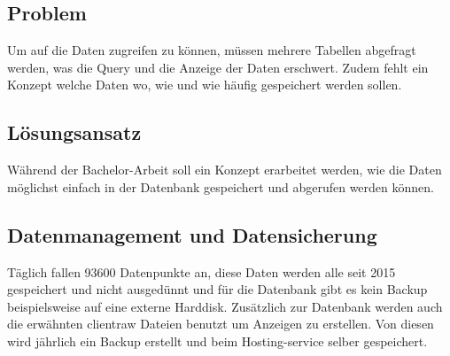 \begin{table}[h!]
\caption{Vorhandene Daten in der Datenbank}
\label{table:db-tables}
\end{table}

\subsection*{Problem}
Um auf die Daten zugreifen zu können, müssen mehrere Tabellen abgefragt werden, was die Query und die Anzeige der Daten erschwert. Zudem fehlt ein Konzept welche Daten wo, wie und wie häufig gespeichert werden sollen.

\subsection*{Lösungsansatz}
Während der Bachelor-Arbeit soll ein Konzept erarbeitet werden, wie die Daten möglichst einfach in der Datenbank gespeichert und abgerufen werden können.


\subsection{Datenmanagement und Datensicherung}
Täglich fallen 93600 Datenpunkte an, diese Daten werden alle seit 2015 gespeichert und nicht ausgedünnt und für die Datenbank gibt es kein Backup beispielsweise auf eine externe Harddisk. Zusätzlich zur Datenbank werden auch die erwähnten clientraw Dateien benutzt um Anzeigen zu erstellen. Von diesen wird jährlich ein Backup erstellt und beim Hosting-service selber gespeichert.

